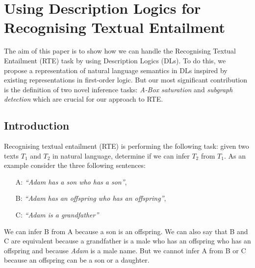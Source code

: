 \documentclass{esslli}
\begin{document}
\chapter{Using Description Logics for\\ Recognising Textual Entailment}

\begin{chapterabstract}
The aim of this paper is to show how we can handle the Recognising Textual Entailment (RTE) task by using Description Logics (DLs). To do this, we propose a representation of natural language semantics in DLs inspired by existing representations in first-order logic. But our most significant contribution is the definition of two novel inference tasks: \emph{A-Box saturation} and \emph{subgraph detection} which are crucial for our approach to RTE.
\end{chapterabstract}

\section{Introduction}

Recognising textual entailment (RTE) is performing the following task:
given two texts $T_1$ and $T_2$ in natural language, determine if we
can infer $T_2$ from $T_1$. As an example consider the three following
sentences:

\begin{itemize}
\item[A:] \emph{``Adam has a son who has a son''},\\[-1.8em]
\item[B:] \emph{``Adam has an offspring who has an offspring''},\\[-1.8em]
\item[C:] \emph{``Adam is a grandfather''}
\end{itemize}

\noindent
We can infer B from A because a son is an offspring. We can also say
that B and C are equivalent because a grandfather is a male who has an
offspring who has an offspring and because \emph{Adam} is a male
name. But we cannot infer A from B or C because an offspring can be a
son or a daughter.
\end{document}

